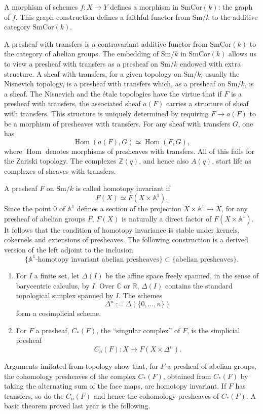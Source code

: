 \documentclass[11pt]{article}
\newcommand{\Aone}{\mathbb A^1}
\newcommand{\Z}{\mathbb Z}
\newcommand{\Sm}{\mathrm{Sm}}
\newcommand{\SmCor}{\mathrm{SmCor}}
\newcommand{\Hom}{\operatorname{Hom}}
\theoremstyle{deligne}
\newcommand{\heading}[1]{\vspace{0.7em}\noindent{\bfseries #1}\quad}
\begin{document}
A morphism of schemes \(f:X\to Y\) defines a morphism in \(\SmCor(k)\): the graph of \(f\). This graph construction defines a faithful functor from \(\Sm/k\) to the additive category \(\SmCor(k)\).

A presheaf with transfers is a contravariant additive functor from \(\SmCor(k)\) to the category of abelian groups. The embedding of \(\Sm/k\) in \(\SmCor(k)\) allows us to view a presheaf with transfers as a presheaf on \(\Sm/k\) endowed with extra structure. A sheaf with transfers, for a given topology on \(\Sm/k\), usually the Nisnevich topology, is a presheaf with transfers which, as a presheaf on \(\Sm/k\), is a sheaf. The Nisnevich and the étale topologies have the virtue that if \(F\) is a presheaf with transfers, the associated sheaf \(a(F)\) carries a structure of sheaf with transfers. This structure is uniquely determined by requiring \(F\to a(F)\) to be a morphism of presheaves with transfers. For any sheaf with transfers \(G\), one has
\[
  \Hom(a(F),G)\simeq \Hom(F,G),
\]
where \(\Hom\) denotes morphisms of presheaves with transfers. All of this fails for the Zariski topology. The complexes \(\Z(q)\), and hence also \(A(q)\), start life as complexes of sheaves with transfers.

\heading{1.4.} A presheaf \(F\) on \(\Sm/k\) is called homotopy invariant if
\[
  F(X)\simeq F(X\times \Aone).
\]
Since the point \(0\) of \(\Aone\) defines a section of the projection \(X\times\Aone\to X\), for any presheaf of abelian groups \(F\), \(F(X)\) is naturally a direct factor of \(F(X\times\Aone)\). It follows that the condition of homotopy invariance is stable under kernels, cokernels and extensions of presheaves. The following construction is a derived version of the left adjoint to the inclusion
\[
  \{
  \Aone\text{-homotopy invariant abelian presheaves}
  \}\subset
  \{
  \text{abelian presheaves}
  \}.
\]
\begin{enumerate}[label=(\alph*)]
\item For \(I\) a finite set, let \(\Delta(I)\) be the affine space freely spanned, in the sense of barycentric calculus, by \(I\). Over \(\mathbb C\) or \(\mathbb R\), \(\Delta(I)\) contains the standard topological simplex spanned by \(I\). The schemes
\[
  \Delta^n:=\Delta(\{0,\ldots,n\})
\]
form a cosimplicial scheme.
\item For \(F\) a presheaf, \(C_*(F)\), the ``singular complex'' of \(F\), is the simplicial presheaf
\[
  C_n(F):X\longmapsto F(X\times\Delta^n).
\]
\end{enumerate}
Arguments imitated from topology show that, for \(F\) a presheaf of abelian groups, the cohomology presheaves of the complex \(C_*(F)\), obtained from \(C_*(F)\) by taking the alternating sum of the face maps, are homotopy invariant. If \(F\) has transfers, so do the \(C_n(F)\) and hence the cohomology presheaves of \(C_*(F)\). A basic theorem proved last year is the following.
\end{document}
